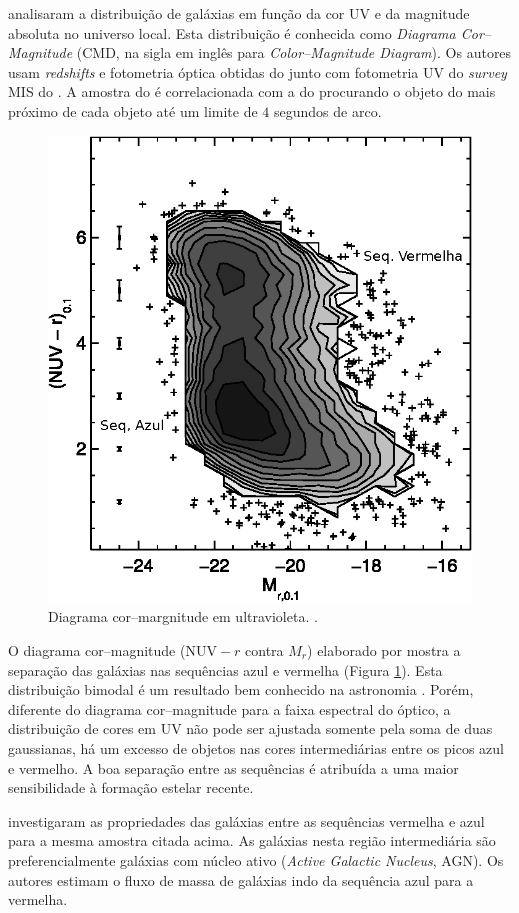 \citet{Wyder2007} analisaram a distribuição de galáxias em função da cor UV e da
magnitude absoluta no universo local. Esta distribuição é conhecida como {\em
Diagrama Cor--Magnitude} (CMD, na sigla em inglês para {\em Color--Magnitude
Diagram}). Os autores usam {\em redshifts} e fotometria óptica obtidas do \SDSS
junto com fotometria UV do {\em survey} MIS do \galex. A amostra do \SDSS é
correlacionada com a do \galex procurando o objeto do \galex mais próximo de
cada objeto \SDSS até um limite de $4$ segundos de arco.

\begin{figure}
	\includegraphics[width=0.5\columnwidth]{figuras/cmd-wyder.eps}
	\caption[Diagrama cor--margnitude em ultravioleta.]
	{Diagrama cor--margnitude em ultravioleta. \citep[figura 7]{Wyder2007}.}
	\label{fig:WyderCMD}
\end{figure}

O diagrama cor--magnitude ($\mathrm{NUV}-r$ contra $M_r$) elaborado por
\citeauthor{Wyder2007} mostra a separação das galáxias nas sequências azul e
vermelha (Figura \ref{fig:WyderCMD}). Esta distribuição bimodal é um resultado
bem conhecido na astronomia \citep{Baldry2004}. Porém, diferente do diagrama
cor--magnitude para a faixa espectral do óptico, a distribuição de cores em UV
não pode ser ajustada somente pela soma de duas gaussianas, há um excesso de
objetos nas cores intermediárias entre os picos azul e vermelho. A boa separação
entre as sequências é atribuída a uma maior sensibilidade à formação estelar
recente.

\citet{Martin2007} investigaram as propriedades das galáxias entre as sequências
vermelha e azul para a mesma amostra citada acima. As galáxias nesta região
intermediária são preferencialmente galáxias com núcleo ativo ({\em Active
Galactic Nucleus}, AGN). Os autores estimam o fluxo de massa de galáxias indo da
sequência azul para a vermelha.

